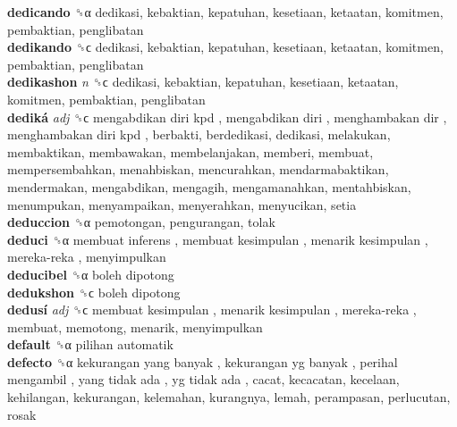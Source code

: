 \textbf{dedicando} ␝α  dedikasi, kebaktian, kepatuhan, kesetiaan, ketaatan, komitmen, pembaktian, penglibatan  \\
\textbf{dedikando} ␝ϲ  dedikasi, kebaktian, kepatuhan, kesetiaan, ketaatan, komitmen, pembaktian, penglibatan  \\
\textbf{dedikashon} \emph{n}  ␝ϲ  dedikasi, kebaktian, kepatuhan, kesetiaan, ketaatan, komitmen, pembaktian, penglibatan  \\
\textbf{dediká} \emph{adj}  ␝ϲ   mengabdikan diri kpd ,  mengabdikan diri ,  menghambakan dir ,  menghambakan diri kpd , berbakti, berdedikasi, dedikasi, melakukan, membaktikan, membawakan, membelanjakan, memberi, membuat, mempersembahkan, menahbiskan, mencurahkan, mendarmabaktikan, mendermakan, mengabdikan, mengagih, mengamanahkan, mentahbiskan, menumpukan, menyampaikan, menyerahkan, menyucikan, setia  \\
\textbf{deduccion} ␝α  pemotongan, pengurangan, tolak  \\
\textbf{deduci} ␝α   membuat inferens ,  membuat kesimpulan ,  menarik kesimpulan ,  mereka-reka , menyimpulkan  \\
\textbf{deducibel} ␝α   boleh dipotong   \\
\textbf{dedukshon} ␝ϲ   boleh dipotong   \\
\textbf{dedusí} \emph{adj}  ␝ϲ   membuat kesimpulan ,  menarik kesimpulan ,  mereka-reka , membuat, memotong, menarik, menyimpulkan  \\
\textbf{default} ␝α   pilihan automatik   \\
\textbf{defecto} ␝α   kekurangan yang banyak ,  kekurangan yg banyak ,  perihal mengambil ,  yang tidak ada ,  yg tidak ada , cacat, kecacatan, kecelaan, kehilangan, kekurangan, kelemahan, kurangnya, lemah, perampasan, perlucutan, rosak  \\
